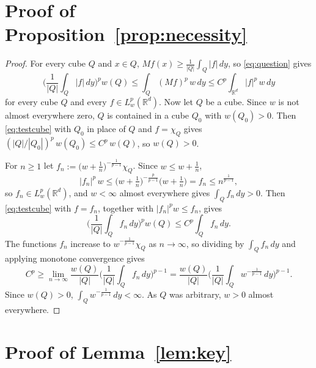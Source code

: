 \documentclass[12pt]{article}
\begin{document}
\section{Proof of Proposition~\ref{prop:necessity}}\label{app:necessity}

\begin{proof}
For every cube $Q$ and $x \in Q$, $Mf(x) \ge \frac{1}{|Q|}\int_Q |f|\,dy$, so \eqref{eq:question} gives
\begin{equation}\label{eq:testcube}
  \Big( \frac{1}{|Q|} \int_Q |f|\,dy \Big)^p w(Q) \le \int_Q (Mf)^p\, w\,dy \le C^p \int_{\mathbb{R}^d} |f|^p\, w\,dy
\end{equation}
for every cube $Q$ and every $f \in L^p_w(\mathbb{R}^d)$. Now let $Q$ be a cube. Since $w$ is not almost everywhere zero, $Q$ is contained in a cube $Q_0$ with $w(Q_0) > 0$. Then \eqref{eq:testcube} with $Q_0$ in place of $Q$ and $f = \chi_Q$ gives $(|Q|/|Q_0|)^p\, w(Q_0) \le C^p\, w(Q)$, so $w(Q) > 0$.

For $n \ge 1$ let $f_n := \big(w + \tfrac{1}{n}\big)^{-\frac{1}{p-1}}\chi_Q$. Since $w \le w + \frac{1}{n}$,
\[
  |f_n|^p\, w \le \big(w + \tfrac{1}{n}\big)^{-\frac{p}{p-1}}\big(w + \tfrac{1}{n}\big) = f_n \le n^{\frac{1}{p-1}},
\]
so $f_n \in L^p_w(\mathbb{R}^d)$, and $w < \infty$ almost everywhere gives $\int_Q f_n\,dy > 0$. Then \eqref{eq:testcube} with $f = f_n$, together with $|f_n|^p w \le f_n$, gives
\[
  \Big( \frac{1}{|Q|} \int_Q f_n\,dy \Big)^p w(Q) \le C^p \int_Q f_n\,dy .
\]
The functions $f_n$ increase to $w^{-\frac{1}{p-1}}\chi_Q$ as $n \to \infty$, so dividing by $\int_Q f_n\,dy$ and applying monotone convergence gives
\[
  C^p \ge \lim_{n\to\infty} \frac{w(Q)}{|Q|} \Big( \frac{1}{|Q|} \int_Q f_n\,dy \Big)^{p-1} = \frac{w(Q)}{|Q|} \Big( \frac{1}{|Q|} \int_Q w^{-\frac{1}{p-1}}\,dy \Big)^{p-1}.
\]
Since $w(Q) > 0$, $\int_Q w^{-\frac{1}{p-1}}\,dy < \infty$. As $Q$ was arbitrary, $w > 0$ almost everywhere.
\end{proof}


\section{Proof of Lemma~\ref{lem:key}}\label{app:weighted}
\end{document}

